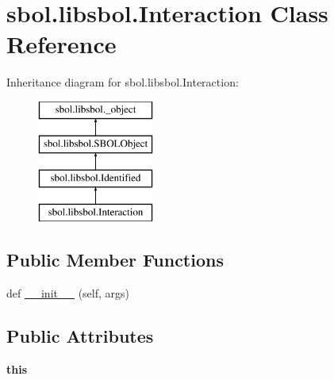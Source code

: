 \hypertarget{classsbol_1_1libsbol_1_1_interaction}{}\section{sbol.\+libsbol.\+Interaction Class Reference}
\label{classsbol_1_1libsbol_1_1_interaction}
Inheritance diagram for sbol.\+libsbol.\+Interaction\+:\begin{figure}[H]
\begin{center}
\leavevmode
\includegraphics[height=4.000000cm]{classsbol_1_1libsbol_1_1_interaction}
\end{center}
\end{figure}
\subsection*{Public Member Functions}
\begin{DoxyCompactItemize}
\item 
def \hyperlink{classsbol_1_1libsbol_1_1_interaction_a9b81eae3a393df0d5c610f6622408c82}{\+\_\+\+\_\+init\+\_\+\+\_\+} (self, args)
\end{DoxyCompactItemize}
\subsection*{Public Attributes}
\begin{DoxyCompactItemize}
\item 
{\bfseries this}\hypertarget{classsbol_1_1libsbol_1_1_interaction_a29a5965a5a50f41615e780040e39dc02}{}\label{classsbol_1_1libsbol_1_1_interaction_a29a5965a5a50f41615e780040e39dc02}

\end{DoxyCompactItemize}
